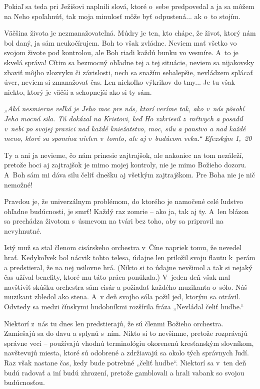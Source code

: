 Pokiaľ sa teda pri Ježišovi naplnili slová, ktoré o~sebe predpovedal a ja sa môžem na Neho spoľahnúť, tak moja minulosť môže byť odpustená... ak o~to stojím.


Väčšina života je nezmanažovateľná. Múdry je ten, kto chápe, že život, ktorý nám bol daný, ja sám neukočírujem. Boh to však zvládne. Neviem mať všetko vo svojom živote pod kontrolou, ale Boh riadi každú bunku vo vesmíre. A~to je skvelá správa! Cítim sa bezmocný ohľadne tej a tej situácie, neviem sa nijakovsky zbaviť môjho zlozvyku či závislosti, nech sa snažím sebalepšie, nevládzem splácať úver, neviem si zmanažovať  čas. Len niekoľko výkrikov do tmy... Je tu však niekto, ktorý je väčší a schopnejší ako si ty sám.

{\it „Aká nesmierne veľká je Jeho moc pre nás, ktorí veríme tak, ako v~nás pôsobí Jeho mocná sila. Tú dokázal na Kristovi, keď Ho vzkriesil z~mŕtvych a posadil v~nebi po svojej pravici nad každé kniežatstvo, moc, silu a panstvo a nad každé meno, ktoré sa spomína nielen v~tomto, ale aj v~budúcom veku.“ Efezským 1,~20}

Ty a ani ja nevieme, čo nám prinesie zajtrajšok, ale nakoniec na tom nezáleží, pretože hoci aj zajtrajšok je mimo mojej kontroly, nie je mimo Božieho dozoru. A~Boh sám mi dáva silu čeliť dnešku aj všetkým zajtrajškom. Pre Boha nie je nič nemožné!


Pravdou je, že univerzálnym problémom, do ktorého je namočené celé ľudstvo ohľadne budúcnosti, je smrť! Každý raz zomrie -- ako ja, tak aj ty. A~len blázon sa prechádza životom s~úsmevom na tvári bez toho, aby sa pripravil na nevyhnutné.

Istý muž sa stal členom cisárskeho orchestra v~Číne napriek tomu, že nevedel hrať. Kedykoľvek bol nácvik tohto telesa, údajne len priložil svoju flautu k~perám a predstieral, že na nej usilovne hrá. (Nikto si to údajne nevšimol a tak si nejaký čas užíval benefity, ktoré mu táto práca ponúkala.) V~jeden deň však mal navštíviť skúšku orchestra sám cisár a požiadať každého muzikanta o~sólo. Náš muzikant zbledol ako stena. A~v deň svojho sóla požil jed, ktorým sa otrávil. Odvtedy sa medzi čínskymi hudobníkmi rozšírila fráza „Nevládal čeliť hudbe.“

Niektorí z~nás tu dnes len predstierajú, že sú členmi Božieho orchestra. Zamiešajú sa do davu a splynú s~ním. Nikto si to nevšimne, pretože rozprávajú správne veci -- používajú vhodnú terminológiu okorenenú kresťanským slovníkom, navštevujú miesta, ktoré sú odobrené a zdržiavajú sa okolo tých správnych ľudí. Raz však nastane čas, kedy bude potrebné „čeliť hudbe“. Niektorí sa v~ten deň budú radovať a iní budú zhrození, pretože gamblovali a hrali vabank so svojou budúcnosťou.

